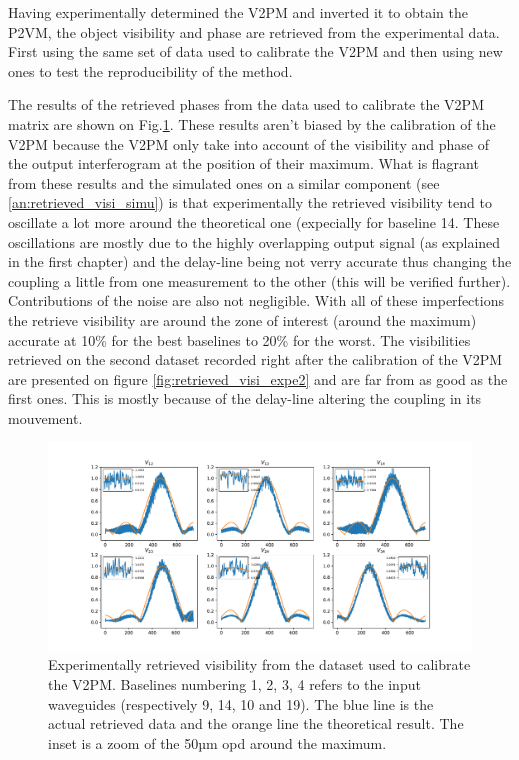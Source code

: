 Having experimentally determined the V2PM and inverted it to obtain the P2VM, the object visibility and phase are retrieved from the experimental  data. First using the same set of data used to calibrate the V2PM and then using new ones to test the reproducibility of the method. 

The results of the retrieved phases from the data used to calibrate the V2PM matrix are shown on Fig.\ref{fig:retrieved_visi_expe}. These results aren't biased by the calibration of the V2PM because the V2PM only take into account of the visibility and phase of the output interferogram at the position of their maximum. What is flagrant from these results and the simulated ones on a similar component (see \ref{an:retrieved_visi_simu}) is that experimentally the retrieved visibility tend to oscillate a lot more around the theoretical one (expecially for baseline 14. These oscillations are mostly due to the highly overlapping output signal (as explained in the first chapter) and the delay-line being not verry accurate thus changing the coupling a little from one measurement to the other (this will be verified further). Contributions of the noise are also not negligible. With all of these imperfections the retrieve visibility are around the zone of interest (around the maximum) accurate at 10\% for the best baselines to 20\% for the worst. The visibilities retrieved on the second dataset recorded right after the calibration of the V2PM are presented on figure \ref{fig:retrieved_visi_expe2} and are far from as good as the first ones. This is mostly because of the delay-line altering the coupling in its mouvement.  


\begin{figure}[htbp!]
 \centering
 \includegraphics[scale=.45]{../picture/retrieve_visi_expe.pdf}
 \caption{Experimentally retrieved visibility from the dataset used to calibrate the V2PM. Baselines numbering 1, 2, 3, 4 refers to the input waveguides (respectively  9, 14, 10 and 19). The blue line is the actual retrieved data and the orange line the theoretical result. The inset is a zoom of the 50µm opd around the maximum. }
 \label{fig:retrieved_visi_expe}
\end{figure}

